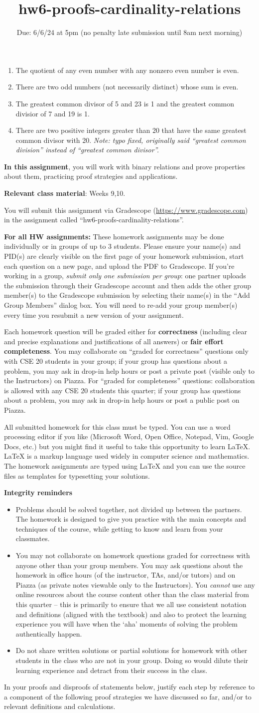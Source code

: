 \documentclass[12pt, oneside]{article}
\newcommand{\instructions}{{\bf For all HW assignments:} 
These homework assignments may be done individually or in groups of up to 3 students.
Please ensure your name(s) and PID(s)
are clearly visible on the first page of your homework
submission, start each question on a new page, and upload the PDF to Gradescope.
If you're working in a group, {\it submit only one submission per group}: one partner uploads the
submission through their Gradescope account and then adds the other group member(s) to the Gradescope submission
by selecting their name(s) in the ``Add Group Members'' dialog box. You will need to re-add your group member(s)
every time you resubmit a new version of your assignment.

Each homework question will be graded either for
{\bf correctness} (including clear and precise explanations and justifications of all answers) or
{\bf fair effort completeness}. You may collaborate on ``graded for correctness''
questions only with CSE 20 students in your group; if your
 group has questions about a problem, you may ask in drop-in help hours or post a private
post (visible only to the Instructors) on Piazza.  
 For ``graded for completeness''
 questions: collaboration is allowed with any CSE 20 students this quarter; 
 if your group has questions about a problem, you may ask in drop-in 
 help hours or post a public post on Piazza.

All submitted homework for this class must be typed. 
You can use a word processing editor if you like (Microsoft Word, Open Office, Notepad, Vim, Google Docs, etc.) 
but you might find it useful to take this opportunity to learn LaTeX. 
LaTeX is a markup language used widely in computer science and mathematics. 
The homework assignments are typed using LaTeX and you can use the source files 
as templates for typesetting your solutions.

{\bf Integrity reminders}
\begin{itemize}
\item Problems should be solved together, not divided up between the partners. The homework is
designed to give you practice with the main concepts and techniques of the course, 
while getting to know and learn from your classmates.
\item You may not collaborate on homework questions graded for correctness with anyone other than your group members.
You may ask questions about the homework in office hours (of the instructor, TAs, and/or tutors) and 
on Piazza (as private notes viewable only to the Instructors).  
You \emph{cannot} use any online resources about the course content other than the class material 
from this quarter -- this is primarily to ensure that we all use consistent notation and
definitions (aligned with the textbook) and also to protect the learning experience you will have when
the `aha' moments of solving the problem authentically happen.
\item Do not share written solutions or partial solutions for homework with 
other students in the class who are not in your group. Doing so would dilute their learning 
experience and detract from their success in the class.
\end{itemize}

}
\begin{document}
\begin{enumerate}[labelindent=0pt, leftmargin=0pt]
        \begin{enumerate}
            \item The quotient of any even number with any nonzero even number is even.
            \item There are two odd numbers (not necessarily distinct) whose sum is even.
            \item The greatest common divisor of 5 and 23 is 1 and the greatest common divisior of 7 and 19 is 1.
            \item There are two positive integers greater than 20 that have the same greatest common divisor with 20. {\it Note: typo fixed, 
            originally said ``greatest common division'' instead of ``greatest common divisor''.}
        \end{enumerate}
    \end{enumerate}

\newpage

\title{hw6-proofs-cardinality-relations}
\date{Due: 6/6/24 at 5pm (no penalty late submission until 8am next morning)}

\maketitle
\thispagestyle{fancy}

{\bf In this assignment}, you will work with binary relations and prove 
properties about them, practicing proof strategies and applications.

{\bf Relevant class material}: Weeks 9,10.

You will submit this assignment via Gradescope
(\href{https://www.gradescope.com}{https://www.gradescope.com}) 
in the assignment called ``hw6-proofs-cardinality-relations''.

\instructions

In your proofs and disproofs of statements below, justify each  step
by reference to  a component of the  following proof  strategies
we  have discussed so far, and/or to relevant definitions and calculations.

\vspace{-10pt}
\end{document}
